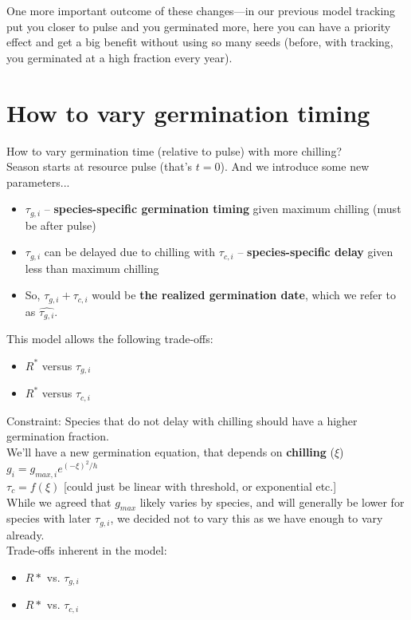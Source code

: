 \documentclass[11pt,letter]{article}
\begin{document}
One more important outcome of these changes---in our previous model tracking put you closer to pulse and you germinated more, here you can have a priority effect and get a big benefit without using so many seeds (before, with tracking, you germinated at a high fraction every year). 


\section{How to vary germination timing} 

How to vary germination time (relative to pulse) with more chilling? \\

Season starts at resource pulse (that's $t=0$). And we introduce some new parameters...
\begin{itemize}
\item $\tau_{g,i}$ -- {\bf species-specific germination timing} given maximum chilling (must be after pulse)
\item $\tau_{g,i}$ can be delayed due to chilling with $\tau_{c,i}$ -- {\bf species-specific delay} given less than maximum chilling
\item So, $\tau_{g,i} + \tau_{c,i}$ would be {\bf the realized germination date}, which we refer to as $\hat{\tau_{g,i}}$. 
\end{itemize}

This model allows the following trade-offs:
\begin{itemize}
\item $R^*$ versus $\tau_{g,i}$ 
\item $R^*$ versus $\tau_{c,i}$ 
\end{itemize}
Constraint: Species that do not delay with chilling should have a higher germination fraction.\\

We'll have a new germination equation, that depends on {\bf chilling} ($\xi$)
$g_i = g_{max, i}e^{(-\xi)^2/h}$\\
$\tau_c = f(\xi)$ [could just be linear with threshold, or exponential etc.]\\

While we agreed that $g_{max}$ likely varies by species, and will generally be lower for species with later $\tau_{g,i}$, we decided not to vary this as we have enough to vary already.\\

Trade-offs inherent in the model:
\begin{itemize}
\item $R*$ vs. $\tau_{g,i}$
\item $R*$ vs. $\tau_{c,i}$
\end{itemize}
\end{document}
